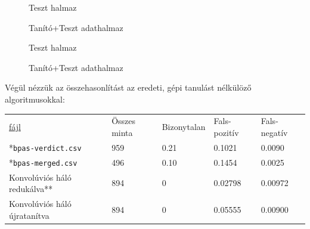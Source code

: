 \begin{figure}[ht]
	
	
	\begin{minipage}[c]{0.5\linewidth}
		
		\caption{Teszt halmaz}
		\label{fig:roc-test-re}
		
	\end{minipage}\hfill
	\begin{minipage}[c]{0.5\linewidth}
		
		\caption{Tanító+Teszt adathalmaz}
		\label{fig:roc-full-re}
		
	\end{minipage}
	\label{fig:ujratanitott.feladat}
\end{figure}



\begin{figure}[ht]
	
	
	\begin{minipage}[c]{0.5\linewidth}
		
		\caption{Teszt halmaz}\label{fig:hist-test}
		
	\end{minipage}\hfill
	\begin{minipage}[c]{0.5\linewidth}
		
		\caption{Tanító+Teszt adathalmaz}\label{fig:hist-full}
		
	\end{minipage}
	\label{fig:histogram-ujratanitott}
\end{figure}


Végül nézzük az összehasonlítást az eredeti, gépi tanulást nélkülöző algoritmusokkal:


\begin{tabular}{ l l l l l }
	\underline{fájl} 			& Összes minta 	& Bizonytalan	& Fals-pozitív	& Fals-negatív \\
	*\texttt{bpas-verdict.csv} 	& 959 			& 0.21			& 0.1021 	& 0.0090 	\\
	*\texttt{bpas-merged.csv} 	& 496			& 0.10			& 0.1454 	& 0.0025   \\
	
	\hline
	Konvolúviós háló redukálva**& 894			& 0				& 0.02798	& 0.00972	\\
	Konvolúviós háló újratanítva& 894			& 0				& 0.05555	& 0.00900	\\
	
\end{tabular} \mbox{}



